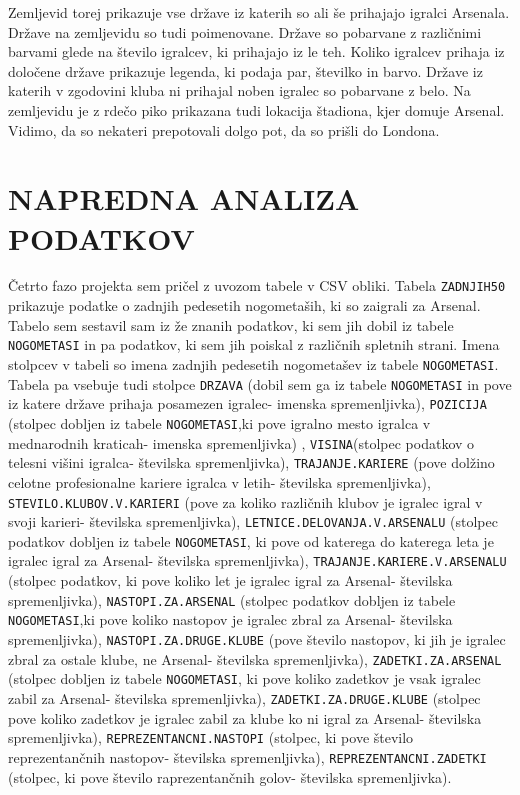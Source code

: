 \documentclass[11pt,a4paper]{article}
\begin{document}
Zemljevid torej prikazuje vse države iz katerih so ali še prihajajo igralci Arsenala. Države na zemljevidu so tudi poimenovane. Države so pobarvane z različnimi barvami glede na število igralcev, ki prihajajo iz le teh. Koliko igralcev prihaja iz določene države prikazuje legenda, ki podaja par, številko in barvo. Države iz katerih v zgodovini kluba ni prihajal noben igralec so pobarvane z belo. Na zemljevidu je z rdečo piko prikazana tudi lokacija štadiona, kjer domuje Arsenal. Vidimo, da so nekateri prepotovali dolgo pot, da so prišli do Londona.



\section{NAPREDNA ANALIZA PODATKOV}
Četrto fazo projekta sem pričel z uvozom tabele v CSV obliki. Tabela \verb|ZADNJIH50| prikazuje podatke o zadnjih pedesetih nogometaših, ki so zaigrali za Arsenal. Tabelo sem sestavil sam iz že znanih podatkov, ki sem jih dobil iz tabele \verb|NOGOMETASI| in pa podatkov, ki sem jih poiskal z različnih spletnih strani. Imena stolpcev v tabeli so imena zadnjih pedesetih nogometašev iz tabele \verb|NOGOMETASI|. Tabela pa vsebuje tudi stolpce \verb|DRZAVA| (dobil sem ga iz tabele \verb|NOGOMETASI| in pove iz katere države prihaja posamezen igralec- imenska spremenljivka), \verb|POZICIJA| (stolpec dobljen iz tabele \verb|NOGOMETASI|,ki pove igralno mesto igralca v mednarodnih kraticah- imenska spremenljivka) , \verb|VISINA|(stolpec podatkov o telesni višini igralca- številska spremenljivka), \verb|TRAJANJE.KARIERE| (pove dolžino celotne profesionalne kariere igralca v letih- številska spremenljivka), \verb|STEVILO.KLUBOV.V.KARIERI| (pove za koliko različnih klubov je igralec igral v svoji karieri- številska spremenljivka), \verb|LETNICE.DELOVANJA.V.ARSENALU| (stolpec podatkov dobljen iz tabele \verb|NOGOMETASI|, ki pove od katerega do katerega leta je igralec igral za Arsenal- številska spremenljivka), \verb|TRAJANJE.KARIERE.V.ARSENALU| (stolpec podatkov, ki pove koliko let je igralec igral za Arsenal- številska spremenljivka), \verb|NASTOPI.ZA.ARSENAL| (stolpec podatkov dobljen iz tabele \texttt{NOGOME\-TA\-SI},ki pove koliko nastopov je igralec zbral za Arsenal- številska spremenljivka), \verb|NASTOPI.ZA.DRUGE.KLUBE| (pove število nastopov, ki jih je igralec zbral za ostale klube, ne Arsenal- številska spremenljivka), \texttt{ZADETKI.ZA.AR\-SE\-NAL} (stolpec dobljen iz tabele \verb|NOGOMETASI|, ki pove koliko zadetkov je vsak igralec zabil za Arsenal- številska spremenljivka), \verb|ZADETKI.ZA.DRUGE.KLUBE| (stolpec pove koliko zadetkov je igralec zabil za klube ko ni igral za Arsenal- številska spremenljivka), \verb|REPREZENTANCNI.NASTOPI| (stolpec, ki pove število reprezentančnih nastopov- številska spremenljivka), \texttt{REPREZENTANCNI.ZA\-DET\-KI} (stolpec, ki pove število raprezentančnih golov- številska spremenljivka).
\end{document}
